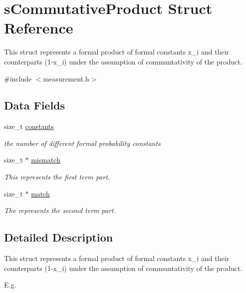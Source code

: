\hypertarget{structsCommutativeProduct}{\section{s\-Commutative\-Product \-Struct \-Reference}
\label{structsCommutativeProduct}
}


\-This struct represents a formal product of formal constants x\-\_\-i and their counterparts (1-\/x\-\_\-i) under the assumption of communtativity of the product.  




{\ttfamily \#include $<$measurement.\-h$>$}

\subsection*{\-Data \-Fields}
\begin{DoxyCompactItemize}
\item 
size\-\_\-t \hyperlink{structsCommutativeProduct_af77351b19630473b2fedc9267665032a}{constants}
\begin{DoxyCompactList}\small\item\em the number of different formal probability constants \end{DoxyCompactList}\item 
size\-\_\-t $\ast$ \hyperlink{structsCommutativeProduct_a95aa7c0ea80854b88afc16d913137f35}{mismatch}
\begin{DoxyCompactList}\small\item\em \-This represents the first term part. \end{DoxyCompactList}\item 
size\-\_\-t $\ast$ \hyperlink{structsCommutativeProduct_ae78261dbaf0a6455774a84836fe7334d}{match}
\begin{DoxyCompactList}\small\item\em \-The represents the second term part. \end{DoxyCompactList}\end{DoxyCompactItemize}


\subsection{\-Detailed \-Description}
\-This struct represents a formal product of formal constants x\-\_\-i and their counterparts (1-\/x\-\_\-i) under the assumption of communtativity of the product. 

\-E.\-g.

